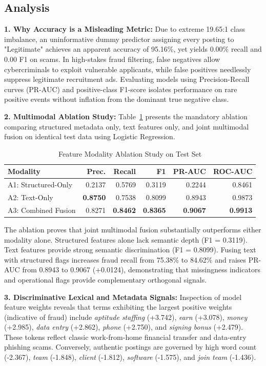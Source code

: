 \documentclass[conference]{IEEEtran}
\begin{document}
\subsection{Analysis}
\textbf{1. Why Accuracy is a Misleading Metric:}
Due to extreme 19.65:1 class imbalance, an uninformative dummy predictor assigning every posting to "Legitimate" achieves an apparent accuracy of 95.16\%, yet yields 0.00\% recall and 0.00 F1 on scams. In high-stakes fraud filtering, false negatives allow cybercriminals to exploit vulnerable applicants, while false positives needlessly suppress legitimate recruitment ads. Evaluating models using Precision-Recall curves (PR-AUC) and positive-class F1-score isolates performance on rare positive events without inflation from the dominant true negative class.

\textbf{2. Multimodal Ablation Study:}
Table~\ref{tab:ablation} presents the mandatory ablation comparing structured metadata only, text features only, and joint multimodal fusion on identical test data using Logistic Regression.

\begin{table}[htbp]
\caption{Feature Modality Ablation Study on Test Set}
\label{tab:ablation}
\centering
\small
\begin{tabular}{lrrrrr}
\toprule
\textbf{Modality} & \textbf{Prec.} & \textbf{Recall} & \textbf{F1} & \textbf{PR-AUC} & \textbf{ROC-AUC} \\
\midrule
A1: Structured-Only & 0.2137 & 0.5769 & 0.3119 & 0.2244 & 0.8461 \\
A2: Text-Only       & \textbf{0.8750} & 0.7538 & 0.8099 & 0.8943 & 0.9873 \\
A3: Combined Fusion & 0.8271 & \textbf{0.8462} & \textbf{0.8365} & \textbf{0.9067} & \textbf{0.9913} \\
\bottomrule
\end{tabular}
\end{table}

The ablation proves that joint multimodal fusion substantially outperforms either modality alone. Structured features alone lack semantic depth (F1 = 0.3119). Text features provide strong semantic discrimination (F1 = 0.8099). Fusing text with structured flags increases fraud recall from 75.38\% to 84.62\% and raises PR-AUC from 0.8943 to 0.9067 (+0.0124), demonstrating that missingness indicators and operational flags provide complementary orthogonal signals.

\textbf{3. Discriminative Lexical and Metadata Signals:}
Inspection of model feature weights reveals that terms exhibiting the largest positive weights (indicative of fraud) include \textit{aptitude staffing} (+3.742), \textit{earn} (+3.078), \textit{money} (+2.985), \textit{data entry} (+2.862), \textit{phone} (+2.750), and \textit{signing bonus} (+2.479). These tokens reflect classic work-from-home financial transfer and data-entry phishing scams. Conversely, authentic postings are governed by high word count (-2.367), \textit{team} (-1.848), \textit{client} (-1.812), \textit{software} (-1.575), and \textit{join team} (-1.436).
\end{document}
